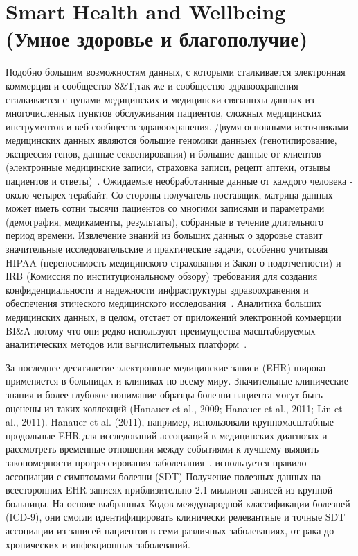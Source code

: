 \section{Smart Health and Wellbeing (Умное здоровье и благополучие)}
Подобно большим возможностям данных, с которыми сталкивается электронная коммерция и сообщество S\&T,так же и сообщество здравоохранения сталкивается с
цунами медицинских и медицински связаннхы данных из многочисленных пунктов обслуживания пациентов, сложных
медицинских инструментов и веб-сообществ здравоохранения.
Двумя основными источниками медицинских данных являются большие геномики данныех (генотипирование, экспрессия генов, данные секвенирования) и
большие данные от клиентов (электронные медицинские записи, страховка
записи, рецепт аптеки, отзывы пациентов и
ответы)~\cite{Miller:2012a}. Ожидаемые необработанные данные
от каждого человека - около четырех терабайт. Со стороны получатель-поставщик, матрица данных может иметь сотни
тысячи пациентов со многими записями и параметрами
(демография, медикаменты, результаты), собранные в течение длительного
период времени. Извлечение знаний из больших данных о здоровье
ставит значительные исследовательские и практические задачи, особенно
учитывая HIPAA (переносимость медицинского страхования и
Закон о подотчетности) и IRB (Комиссия по институциональному обзору)
требования для создания конфиденциальности и надежности
инфраструктуры здравоохранения и обеспечения этического медицинского
исследования~\cite{Gelfand:2012}. Аналитика больших медицинских данных,
в целом, отстает от приложений электронной коммерции BI\&A
потому что они редко используют преимущества масштабируемых аналитических
методов или вычислительных платформ~\cite{Miller:2012a}.

За последнее десятилетие электронные медицинские записи (EHR)
широко применяется в больницах и клиниках по всему миру.
Значительные клинические знания и более глубокое понимание
образцы болезни пациента могут быть оценены из таких коллекций
(Hanauer et al., 2009; Hanauer et al., 2011; Lin et al., 2011).
Hanauer et al. (2011), например, использовали крупномасштабные продольные
EHR для исследований ассоциаций в медицинских диагнозах
и рассмотреть временные отношения между событиями к лучшему
выявить закономерности прогрессирования заболевания~\cite{Lin:2011}.
используется правило ассоциации с симптомами болезни (SDT)
Получение полезных данных на всесторонних EHR записях приблизительно 2.1
миллион записей из крупной больницы. На основе выбранных
Кодов международной классификации болезней (ICD-9), они
смогли идентифицировать клинически релевантные и точные SDT
ассоциации из записей пациентов в семи различных заболеваниях,
от рака до хронических и инфекционных заболеваний.

